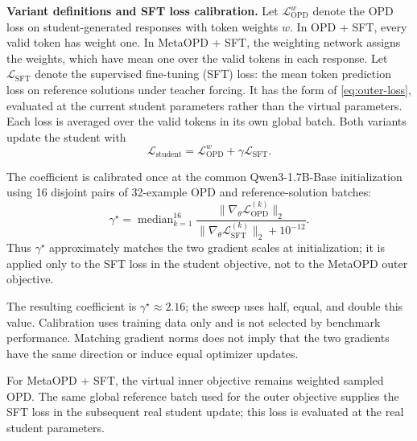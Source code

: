 \documentclass{article}
\theoremstyle{plain}
\theoremstyle{definition}
\theoremstyle{remark}
\begin{document}
\textbf{Variant definitions and SFT loss calibration.}
Let \(\mathcal L_{\mathrm{OPD}}^w\) denote the OPD loss on student-generated responses with token weights \(w\). In OPD + SFT, every valid token has weight one. In MetaOPD + SFT, the weighting network assigns the weights, which have mean one over the valid tokens in each response. Let \(\mathcal L_{\mathrm{SFT}}\) denote the supervised fine-tuning (SFT) loss: the mean token prediction loss on reference solutions under teacher forcing. It has the form of \cref{eq:outer-loss}, evaluated at the current student parameters rather than the virtual parameters. Each loss is averaged over the valid tokens in its own global batch. Both variants update the student with
\[
    \mathcal L_{\mathrm{student}}
    =\mathcal L_{\mathrm{OPD}}^w+\gamma\mathcal L_{\mathrm{SFT}}.
\]

The coefficient is calibrated once at the common Qwen3-1.7B-Base initialization using 16 disjoint pairs of 32-example OPD and reference-solution batches:
\[
    \gamma^\star
    =\operatorname{median}_{k=1}^{16}
    \frac{\lVert\nabla_\theta\mathcal L_{\mathrm{OPD}}^{(k)}\rVert_2}
         {\lVert\nabla_\theta\mathcal L_{\mathrm{SFT}}^{(k)}\rVert_2+10^{-12}}.
\]
Thus \(\gamma^\star\) approximately matches the two gradient scales at initialization; it is applied only to the SFT loss in the student objective, not to the MetaOPD outer objective.

The resulting coefficient is \(\gamma^\star\approx2.16\); the sweep uses half, equal, and double this value. Calibration uses training data only and is not selected by benchmark performance. Matching gradient norms does not imply that the two gradients have the same direction or induce equal optimizer updates.

For MetaOPD + SFT, the virtual inner objective remains weighted sampled OPD. The same global reference batch used for the outer objective supplies the SFT loss in the subsequent real student update; this loss is evaluated at the real student parameters.
\end{document}

